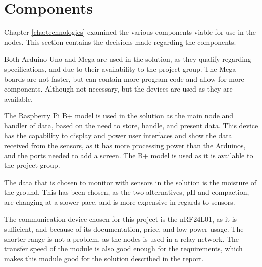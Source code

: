 \section{Components}
Chapter \ref{cha:technologies} examined the various components viable for use in the nodes. This section contains the decisions made regarding the components.

Both Arduino Uno and Mega are used in the solution, as they qualify regarding specifications, and due to their availability to the project group. The Mega boards are not faster, but can contain more program code and allow for more components. Although not necessary, but the devices are used as they are available.

The Raspberry Pi B+ model is used in the solution as the main node and handler of data, based on the need to store, handle, and present data.  This device has the capability to display and power user interfaces and show the data received from the sensors, as it has more processing power than the Arduinos, and the ports needed to add a screen. The B+ model is used as it is available to the project group.

The data that is chosen to monitor with sensors in the solution is the moisture of the ground. This has been chosen, as the two alternatives, pH and compaction, are changing at a slower pace, and is more expensive in regards to sensors.

The communication device chosen for this project is the nRF24L01, as it is sufficient, and because of its documentation, price, and low power usage. The shorter range is not a problem, as the nodes is used in a relay network. The transfer speed of the module is also good enough for the requirements, which makes this module good for the solution described in the report.

